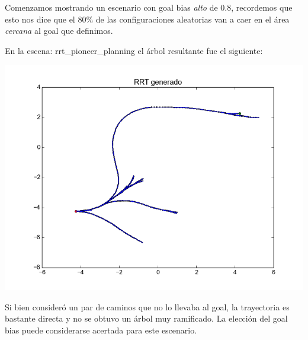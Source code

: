 Comenzamos mostrando un escenario con goal bias \textit{alto} de $0.8$, recordemos que esto nos dice que el $80\%$ de las configuraciones aleatorias van a caer en el área \textit{cercana} al goal que definimos.

En la escena: rrt\_pioneer\_planning el árbol resultante fue el siguiente:

\includegraphics[scale=0.5]{tp4_imagenes/informe_goal_bias_08.png}

Si bien consideró un par de caminos que no lo llevaba al goal, la trayectoria es bastante directa y no se obtuvo un árbol muy ramificado. La elección del goal bias puede considerarse acertada para este escenario.

